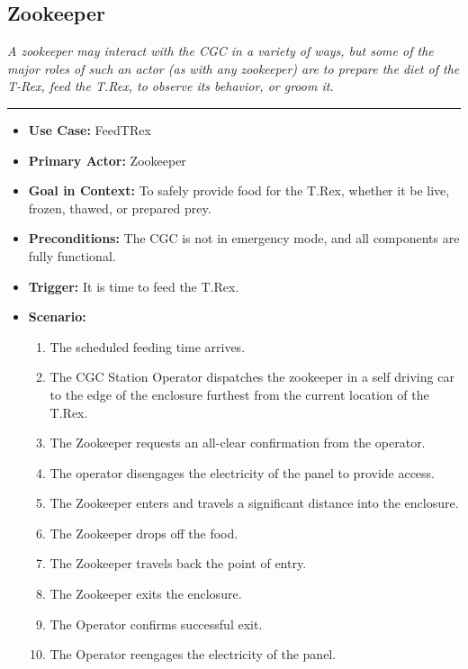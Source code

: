 \documentclass[12pt]{article}
\begin{document}
    \subsection{Zookeeper}
    \textit{A zookeeper may interact with the CGC in a variety of ways, but some of the
    major roles of such an actor (as with any zookeeper) are to prepare the diet of the T-Rex, 
    feed the T.Rex, to observe its behavior, or groom it.}
    \par\noindent\rule{\textwidth}{0.4pt}    
    \begin{itemize}
        \item[]\textbf{Use Case:} 
            FeedTRex                                

        \item[]\textbf{Primary Actor:}
            Zookeeper

        \item[]\textbf{Goal in Context:}
            To safely provide food for the T.Rex, whether it be live, frozen, thawed, or prepared
            prey.

        \item[]\textbf{Preconditions:}
            The CGC is not in emergency mode, and all components are fully functional.

        \item[]\textbf{Trigger:}
            It is time to feed the T.Rex.

        \item[]\textbf{Scenario:}
            \begin{enumerate}
                \item The scheduled feeding time arrives.
                \item The CGC Station Operator dispatches the zookeeper in a self driving car
                to the edge of the enclosure furthest from the current location of the T.Rex.
                \item The Zookeeper requests an all-clear confirmation from the operator.
                \item The operator disengages the electricity of the panel to provide access.
                \item The Zookeeper enters and travels a significant distance into the enclosure.
                \item The Zookeeper drops off the food.
                \item The Zookeeper travels back the point of entry.
                \item The Zookeeper exits the enclosure.
                \item The Operator confirms successful exit.
                \item The Operator reengages the electricity of the panel. 
            \end{enumerate}


\end{itemize}
\end{document}
